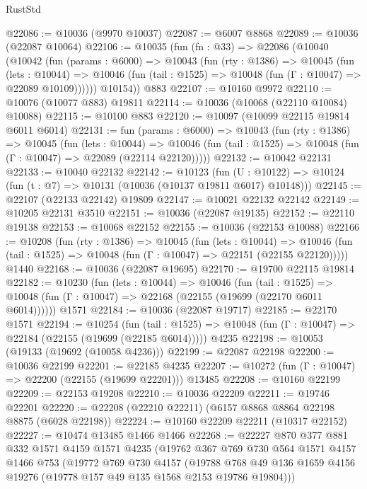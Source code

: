 \begin{lexlean}{RustStd}
\begin{coremodule}
{{@22086 := @10036 (@9970 @10037)
@22087 := @6007 @8868
@22089 := @10036 (@22087 @10064)
@22106 := @10035
    (fun (fn : @33) =>
    @22086
      (@10040
        (@10042
          (fun (params : @6000) =>
          @10043
            (fun (rty : @1386) =>
            @10045
              (fun (lets : @10044) =>
              @10046 (fun (tail : @1525) => @10048 (fun (Γ : @10047) => @22089 @10109))))))
        @10154))
    @883
@22107 := @10160 @9972
@22110 := @10076 (@10077 @883) @19811
@22114 := @10036 (@10068 (@22110 @10084) @10088)
@22115 := @10100 @883
@22120 := @10097 (@10099 @22115 @19814 @6011 @6014)
@22131 := fun (params : @6000) =>
  @10043
    (fun (rty : @1386) =>
    @10045
      (fun (lets : @10044) =>
      @10046 (fun (tail : @1525) => @10048 (fun (Γ : @10047) => @22089 (@22114 @22120)))))
@22132 := @10042 @22131
@22133 := @10040 @22132
@22142 := @10123
    (fun (U : @10122) => @10124 (fun (t : @7) => @10131 (@10036 (@10137 @19811 @6017) @10148)))
@22145 := @22107 (@22133 @22142) @19809
@22147 := @10021 @22132 @22142
@22149 := @10205 @22131 @3510
@22151 := @10036 (@22087 @19135)
@22152 := @22110 @19138
@22153 := @10068 @22152
@22155 := @10036 (@22153 @10088)
@22166 := @10208
    (fun (rty : @1386) =>
    @10045
      (fun (lets : @10044) =>
      @10046 (fun (tail : @1525) => @10048 (fun (Γ : @10047) => @22151 (@22155 @22120)))))
    @1440
@22168 := @10036 (@22087 @19695)
@22170 := @19700 @22115 @19814
@22182 := @10230
    (fun (lets : @10044) =>
    @10046
      (fun (tail : @1525) =>
      @10048 (fun (Γ : @10047) => @22168 (@22155 (@19699 (@22170 @6011 @6014))))))
    @1571
@22184 := @10036 (@22087 @19717)
@22185 := @22170 @1571
@22194 := @10254
    (fun (tail : @1525) => @10048 (fun (Γ : @10047) => @22184 (@22155 (@19699 (@22185 @6014)))))
    @4235
@22198 := @10053 (@19133 (@19692 (@10058 @4236)))
@22199 := @22087 @22198
@22200 := @10036 @22199
@22201 := @22185 @4235
@22207 := @10272 (fun (Γ : @10047) => @22200 (@22155 (@19699 @22201))) @13485
@22208 := @10160 @22199
@22209 := @22153 @19208
@22210 := @10036 @22209
@22211 := @19746 @22201
@22220 := @22208 (@22210 @22211) (@6157 @8868 @8864 @22198 @8875 (@6028 @22198))
@22224 := @10160 @22209 @22211 (@10317 @22152)
@22227 := @10474 @13485 @1466 @1466
@22268 := @22227
    @870
    @377
    @881
    @332
    @1571
    @4159
    @1571
    @4235
    (@19762
      @367
      @769
      @730
      @564
      @1571
      @4157
      @1466
      @753
      (@19772
        @769
        @730
        @4157
        (@19788 @768 @49 @136 @1659 @4156 @19276 (@19778 @157 @49 @135 @1568 @2153 @19786 @19804)))
}}
\end{coremodule}
\end{lexlean}
